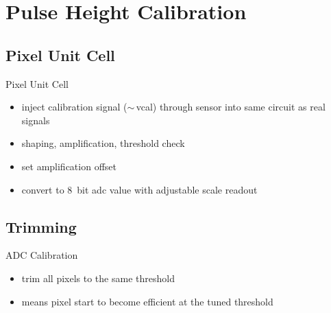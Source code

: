 \section{Pulse Height Calibration}
\subsection{Pixel Unit Cell}
\begin{frame}{Pixel Unit Cell}

	
	\begin{itemize}\itemfill
		\item inject calibration signal ($\sim$\,vcal) through sensor into same circuit as real signals
		\item shaping, amplification, threshold check
		\item set amplification offset
		\item convert to \SI{8}{bit} adc value with adjustable scale \ra readout
	\end{itemize}
	
\end{frame}

\subsection{Trimming}
\begin{frame}{ADC Calibration}
    
    

    \begin{itemize}\itemfill 
        \item<1-> trim all pixels to the same threshold
        \item<2> means pixel start to become efficient at the tuned threshold
    \end{itemize}

\end{frame}

